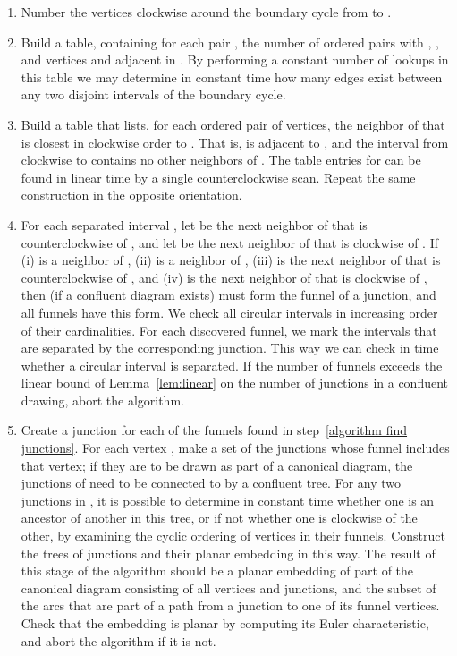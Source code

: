 \documentclass{llncs}
\begin{document}
\begin{enumerate}
\item Number the vertices clockwise around the boundary cycle from  to .
\item\label{algorithm interval adjacency} Build a table, containing for each pair , the number of ordered pairs  with , , and vertices  and  adjacent in . By performing a constant number of lookups in this table we may determine in constant time how many edges exist between any two disjoint intervals of the boundary cycle.
\item Build a table that lists, for each ordered pair  of vertices, the neighbor  of  that is closest in clockwise order to . That is,  is adjacent to , and the interval from  clockwise to  contains no other neighbors of . The table entries for  can be found in linear time by a single counterclockwise scan. Repeat the same construction in the opposite orientation.
\item\label{algorithm find junctions} For each separated interval , let  be the next neighbor of  that is counterclockwise of , and let  be the next neighbor of  that is clockwise of . If (i)  is a neighbor of , (ii)  is a neighbor of , (iii)  is the next neighbor of  that is counterclockwise of , and (iv)  is the next neighbor of  that is clockwise of , then
(if a confluent diagram exists)  must form the funnel of a junction, and all funnels have this form. We check all circular intervals in increasing order of their cardinalities. For each discovered funnel, we mark the intervals that are separated by the corresponding junction. This way we can check in  time whether a circular interval is separated.
If the number of funnels exceeds the linear bound of Lemma~\ref{lem:linear} on the number of junctions in a confluent drawing, abort the algorithm.
\item\label{algorithm funnel junctions} Create a junction for each of the funnels found in step~\ref{algorithm find junctions}. For each vertex , make a set  of the junctions whose funnel includes that vertex; if they are to be drawn as part of a canonical diagram, the junctions of  need to be connected to  by a confluent tree. For any two junctions in , it is possible to determine in constant time whether one is an ancestor of another in this tree, or if not whether one is clockwise of the other, by examining the cyclic ordering of vertices in their funnels. Construct the trees of junctions and their planar embedding in this way. The result of this stage of the algorithm should be a planar embedding of part of the canonical diagram consisting of all vertices and junctions, and the subset of the arcs that are part of a path from a junction to one of its funnel vertices. Check that the embedding is planar by computing its Euler characteristic, and abort the algorithm if it is not.

\end{enumerate}
\end{document}
